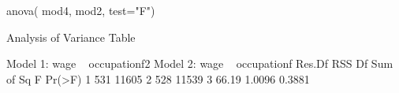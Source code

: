 \begin{Schunk}
\begin{Sinput}
 anova( mod4, mod2,  test="F")
\end{Sinput}
\begin{Soutput}
Analysis of Variance Table

Model 1: wage ~ occupationf2
Model 2: wage ~ occupationf
  Res.Df   RSS Df Sum of Sq      F Pr(>F)
1    531 11605                           
2    528 11539  3     66.19 1.0096 0.3881
\end{Soutput}
\end{Schunk}
